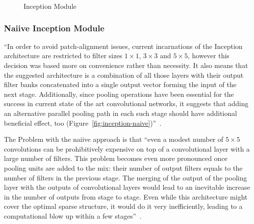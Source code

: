 \documentclass[11pt]{article}
\begin{document}
\begin{figure}[H]
    \centering
    \caption{Inception Module}
\end{figure}

\subsubsection{Naiive Inception Module}

``In order to avoid patch-alignment issues, current incarnations of the Inception architecture are restricted to filter sizes $ 1\times1$, $ 3\times3$ and $ 5\times5$, however this decision was based more on convenience rather than necessity. It also means that the suggested architecture is a combination of all those layers with their output filter banks concatenated into a single output vector forming the input of the next stage. Additionally, since pooling operations have been essential for the success in current state of the art convolutional networks, it suggests that adding an alternative parallel pooling path in each such stage should have additional beneficial effect, too (Figure~\ref{fig:inception-naive})''~\cite{Inception}.

The Problem with the naiive approach is that ``even a modest number of $ 5\times5$ convolutions can be prohibitively expensive on top of a convolutional layer with a large number of filters. This problem becomes even more pronounced once pooling units are added to the mix: their number of output filters equals to the number of filters in the previous stage. The merging of the output of the pooling layer with the outputs of convolutional layers would lead to an inevitable increase in the number of outputs from stage to stage. Even while this architecture might cover the optimal sparse structure, it would do it very inefficiently, leading to a computational blow up within a few stages''~\cite{Inception}.
\end{document}
